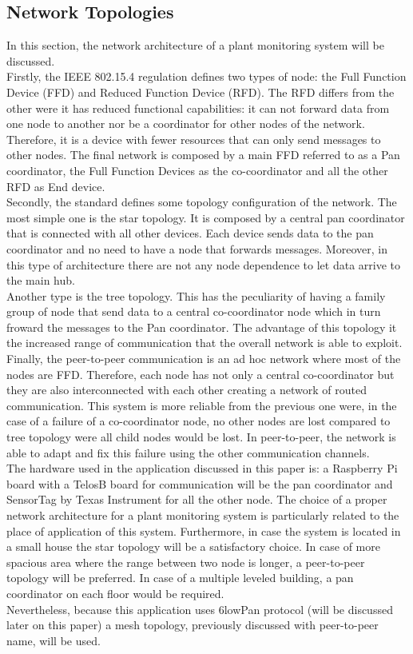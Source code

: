 \subsection{Network Topologies}
In this section, the network architecture of a plant monitoring system will be discussed. \\
Firstly, the IEEE 802.15.4 regulation defines two types of node: the Full Function Device (FFD) and Reduced Function Device (RFD). The RFD differs from the other were it has reduced functional capabilities: it can not forward data from one node to another nor be a coordinator for other nodes of the network. Therefore, it is a device with fewer resources that can only send messages to other nodes. The final network is composed by a main FFD referred to as a Pan coordinator, the Full Function Devices as the co-coordinator and all the other RFD as End device. \cite{802154} \\
Secondly, the standard defines some topology configuration of the network. The most simple one is the star topology. It is composed by a central pan coordinator that is connected with all other devices. Each device sends data to the pan coordinator and no need to have a node that forwards messages. Moreover, in this type of architecture there are not any node dependence to let data arrive to the main hub.\\
Another type is the tree topology. This has the peculiarity of having a family group of node that send data to a central co-coordinator node which in turn froward the messages to the Pan coordinator. The advantage of this topology it the increased range of communication that the overall network is able to exploit.
Finally, the peer-to-peer communication is an ad hoc network where most of the nodes are FFD. Therefore, each node has not only a central co-coordinator but they are also interconnected with each other creating a network of routed communication. This system is more reliable from the previous one were, in the case of a failure of a co-coordinator node, no other nodes are lost compared to tree topology were all child nodes would be lost. In peer-to-peer, the network is able to adapt and fix this failure using the other communication channels. \cite{slide}\\
The hardware used in the application discussed in this paper is: a Raspberry Pi board with a TelosB board for communication will be the pan coordinator and SensorTag by Texas Instrument for all the other node. The choice of a proper network architecture for a plant monitoring system is particularly related to the place of application of this system. Furthermore, in case the system is located in a small house the star topology will be a satisfactory choice. In case of more spacious area where the range between two node is longer, a peer-to-peer topology will be preferred. In case of a multiple leveled building, a pan coordinator on each floor would be required.\\
Nevertheless, because this application uses 6lowPan protocol (will be discussed later on this paper) a mesh topology, previously discussed with peer-to-peer name, will be used.
\\

